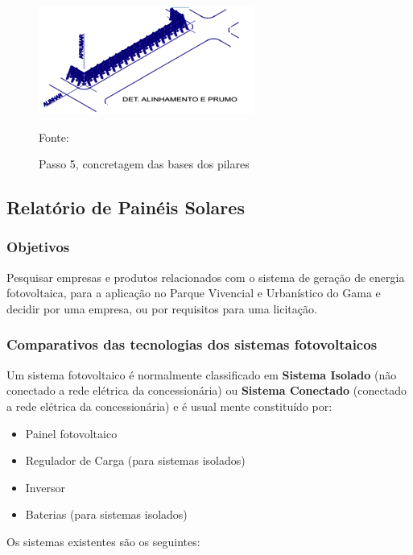 \begin{figure}[h!]
	\centering
	\label{ConcretagemBasesPilares}
		\includegraphics[keepaspectratio=true,scale=0.8]{figuras/ConcretagemBasesPilares.png}
	\caption{Passo 5, concretagem das bases dos pilares}
	\small{Fonte: \cite{CatalogoCercamento}}
\end{figure}

\subsection{Relat\'orio de Pain\'eis Solares}

\subsubsection{Objetivos}

Pesquisar empresas e produtos relacionados com o sistema de gera\c{c}\~ao de energia fotovoltaica, para a aplica\c{c}\~ao no Parque Vivencial e Urban\'istico do Gama e decidir por uma empresa, ou por requisitos para uma licita\c{c}\~ao.

\subsubsection{Comparativos das tecnologias dos sistemas fotovoltaicos}

Um sistema fotovoltaico \'e normalmente classificado em \textbf{Sistema Isolado}  (n\~ao conectado a rede el\'etrica da concession\'aria) ou \textbf{Sistema Conectado}  (conectado a rede el\'etrica da concession\'aria) e \'e usual mente constitu\'ido por:

 \begin{itemize}
        \item Painel fotovoltaico
	\item Regulador de Carga		(para sistemas isolados)
	\item Inversor
	\item Baterias	(para sistemas isolados)
\end{itemize}

Os sistemas existentes s\~ao os seguintes:

